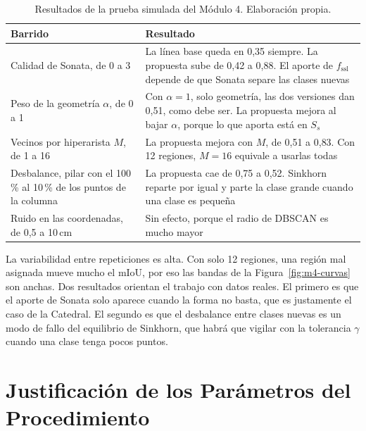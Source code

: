 \begin{table}[!htbp]
\centering
{}\small
\caption[Resultados de la prueba simulada del Módulo 4]{Resultados de la prueba simulada del Módulo 4. Elaboración propia.}
\label{tab:m4-escenarios}
\begin{tabularx}{\linewidth}{@{}>{\raggedright\arraybackslash\hsize=0.7\hsize}X>{\raggedright\arraybackslash\hsize=1.3\hsize}X@{}}
\toprule
\textbf{Barrido} & \textbf{Resultado} \\
\midrule
Calidad de Sonata, de 0 a 3 & La línea base queda en 0{,}35 siempre. La propuesta sube de 0{,}42 a 0{,}88. El aporte de $f_{\mathrm{ssl}}$ depende de que Sonata separe las clases nuevas \\
Peso de la geometría $\alpha$, de 0 a 1 & Con $\alpha=1$, solo geometría, las dos versiones dan 0{,}51, como debe ser. La propuesta mejora al bajar $\alpha$, porque lo que aporta está en $S_s$ \\
Vecinos por hiperarista $M$, de 1 a 16 & La propuesta mejora con $M$, de 0{,}51 a 0{,}83. Con 12 regiones, $M=16$ equivale a usarlas todas \\
Desbalance, pilar con el 100\,\% al 10\,\% de los puntos de la columna & La propuesta cae de 0{,}75 a 0{,}52. Sinkhorn reparte por igual y parte la clase grande cuando una clase es pequeña \\
Ruido en las coordenadas, de 0{,}5 a 10\,cm & Sin efecto, porque el radio de DBSCAN es mucho mayor \\
\bottomrule
\end{tabularx}
\end{table}

La variabilidad entre repeticiones es alta. Con solo 12 regiones, una región mal
asignada mueve mucho el mIoU, por eso las bandas de la Figura~\ref{fig:m4-curvas}
son anchas. Dos resultados orientan el trabajo con datos reales. El primero es que
el aporte de Sonata solo aparece cuando la forma no basta, que es justamente el
caso de la Catedral. El segundo es que el desbalance entre clases nuevas es un
modo de fallo del equilibrio de Sinkhorn, que habrá que vigilar con la tolerancia
$\gamma$ cuando una clase tenga pocos puntos.

\FloatBarrier
\section{Justificación de los Parámetros del Procedimiento}
\label{sec:parametros}

